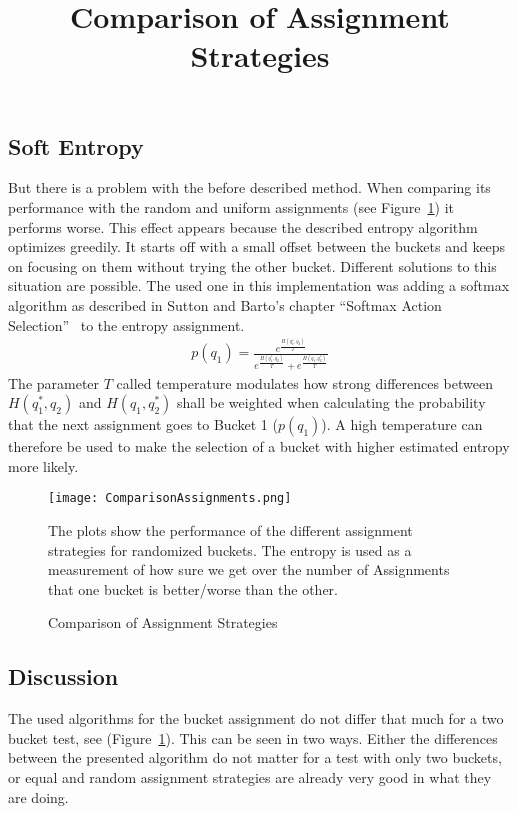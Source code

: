 \documentclass[../Thesis.tex]{subfiles}
\begin{document}
\subsection{Soft Entropy}
But there is a problem with the before described method. When comparing its performance with the random and uniform assignments (see Figure~\ref{fig:AssignmentComp}) it performs worse. This effect appears because the described entropy algorithm optimizes greedily. It starts off with a small offset between the buckets and keeps on focusing on them without trying the other bucket. Different solutions to this situation are possible. The used one in this implementation was adding a softmax algorithm as described in Sutton and Barto's chapter ``Softmax Action Selection''~\cite{sutton1998reinforcement} to the entropy assignment.
\begin{align*}
p(q_1) = \frac{e^{\frac{H(q_1^*,q_2)}{T}}}{e^{\frac{H(q_1^*,q_2)}{T}}+e^{\frac{H(q_1,q_2^*)}{T}}}
\end{align*}
The parameter $T$ called temperature modulates how strong differences between $H(q_1^*,q_2)$ and $H(q_1,q_2^*)$ shall be weighted when calculating the probability that the next assignment goes to Bucket 1 ($p(q_1)$). A high temperature can therefore be used to make the selection of a bucket with higher estimated entropy more likely.
\begin{figure}[ht]
\hfuzz=10cm
\texttt{[image: ComparisonAssignments.png]}
\centering
\title{Comparison of Assignment Strategies}
\caption{Comparison of Assignment Strategies}
The plots show the performance of the different assignment strategies for randomized buckets. The entropy is used as a measurement of how sure we get over the number of Assignments that one bucket is better/worse than the other.
\label{fig:AssignmentComp}
\end{figure}
\subsection{Discussion}
The used algorithms for the bucket assignment do not differ that much for a two bucket test, see (Figure~\ref{fig:AssignmentComp}). This can be seen in two ways. Either the differences between the presented algorithm do not matter for a test with only two buckets, or equal and random assignment strategies are already very good in what they are doing.
\end{document}
